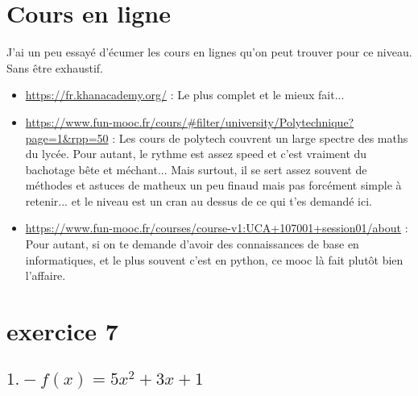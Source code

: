 \documentclass[11pt]{article}
\begin{document}
\section{Cours en ligne}

J'ai un peu essayé d'écumer les cours en lignes qu'on peut trouver pour ce niveau. Sans être exhaustif.

\begin{itemize}
\item \url{https://fr.khanacademy.org/} : Le plus complet et le mieux fait...   
\item \url{https://www.fun-mooc.fr/cours/#filter/university/Polytechnique?page=1&rpp=50} : Les cours de polytech couvrent un large spectre des maths du lycée. Pour autant, le rythme est assez speed et c'est vraiment du bachotage bête et méchant... Mais surtout, il se sert assez souvent de méthodes et astuces de matheux un peu finaud mais pas forcément simple à retenir... et le niveau est un cran au dessus de ce qui t'es demandé ici.
\item \url{https://www.fun-mooc.fr/courses/course-v1:UCA+107001+session01/about} : Pour autant, si on te demande d'avoir des connaissances de base en informatiques, et le plus souvent c'est en python, ce mooc là fait plutôt bien l'affaire.
\end{itemize}

\newpage


\section{exercice 7}

\subsection{$1. - f(x) = 5x^2 +3x + 1$}
\end{document}
